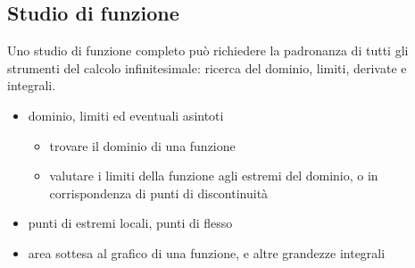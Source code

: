 \documentclass[letterpaper,10pt,italian]{jupyterBook}
\begin{document}
\subsection{Studio di funzione}
\label{\detokenize{ch/infinitesimal_calculus/integrals:studio-di-funzione}}\label{\detokenize{ch/infinitesimal_calculus/integrals:infinitesimal-calculus-integrals-applications-fun}}
\sphinxAtStartPar
Uno studio di funzione completo può richiedere la padronanza di tutti gli strumenti del calcolo infinitesimale: ricerca del dominio, limiti, derivate e integrali.
\begin{itemize}
\item {} 
\sphinxAtStartPar
{\hyperref[\detokenize{ch/infinitesimal_calculus/analysis:infinitesimal-calculus-analysis-applications-fun}]{}} \sphinxhyphen{} dominio, limiti ed eventuali asintoti
\begin{itemize}
\item {} 
\sphinxAtStartPar
trovare il dominio di una funzione

\item {} 
\sphinxAtStartPar
valutare i limiti della funzione agli estremi del dominio, o in corrispondenza di punti di discontinuità

\end{itemize}

\item {} 
\sphinxAtStartPar
{\hyperref[\detokenize{ch/infinitesimal_calculus/derivatives:infinitesimal-calculus-derivatives-applications-fun}]{}} \sphinxhyphen{} punti di estremi locali, punti di flesso

\item {} 
\sphinxAtStartPar
{\hyperref[\detokenize{ch/infinitesimal_calculus/integrals:infinitesimal-calculus-integrals-applications-fun}]{}} \sphinxhyphen{} area sottesa al grafico di una funzione, e altre grandezze integrali

\end{itemize}

\sphinxstepscope
\end{document}
